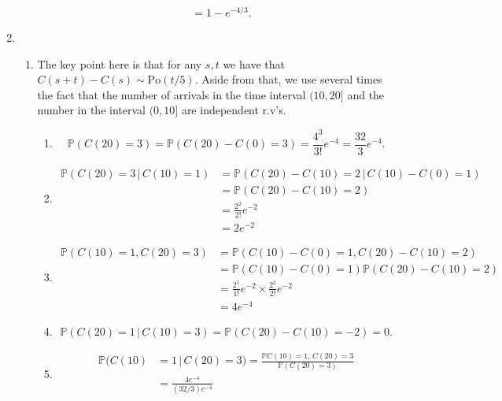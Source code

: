 \documentclass[11pt,a4paper]{article}
\begin{document}
\begin{enumerate}
\begin{enumerate}
\begin{align*}
                &= 1-e^{-4/3}.
            \end{align*}
        \end{enumerate}
        \item 
        \begin{enumerate}
            \item The key point here is that for any $s,t$ we have that $C(s + t) - C(s)\sim \text{Po}(t/5)$. Aside from that, we use several times the fact that the number of arrivals in the time interval $(10,20]$ and the number in the interval $(0,10]$ are independent r.v's.
            \begin{enumerate}
                \item $$\mathbb{P}(C(20) = 3)=\mathbb{P}(C(20)-C(0)=3)=\frac{4^3}{3!}e^{-4}=\frac{32}{3}e^{-4}.$$
                \item 
                \begingroup
                \allowdisplaybreaks
                \begin{align*}
                    \mathbb{P}(C(20)=3\, | \, C(10)=1)
                    &= \mathbb{P}(C(20)-C(10) = 2 \, | \, C(10)-C(0)=1)\\
                    &= \mathbb{P}(C(20)-C(10)=2)\\
                    &= \frac{2^2}{2!}e^{-2}\\
                    &= 2e^{-2}
                \end{align*}
                \endgroup
                \item 
                \begin{align*}
                    \mathbb{P}(C(10) = 1, C(20) = 3)
                    &= \mathbb{P}(C(10)-C(0)=1, C(20)-C(10) = 2)\\
                    &= \mathbb{P}(C(10)-C(0)=1)\mathbb{P}(C(20)-C(10)=2)\\
                    &= \frac{2^1}{1!}e^{-2}\times \frac{2^2}{2!}e^{-2}\\
                    &= 4e^{-4}
                \end{align*}
                \item 
                $$\mathbb{P}(C(20)=1\, | \, C(10)=3) = \mathbb{P}(C(20)-C(10)=-2)=0.$$
                \item 
                \begin{align*}
                    \mathbb{P}(C(10) 
                    &= 1\, | \, C(20) = 3) = \frac{\mathbb{P}C(10) = 1,\, C(20)=3}{\mathbb{P}(C(20)=3)}\\
                    &= \frac{4e^{-4}}{(32/3)e^{-4}}\\

\end{align*}
\end{enumerate}
\end{enumerate}
\end{enumerate}
\end{document}
